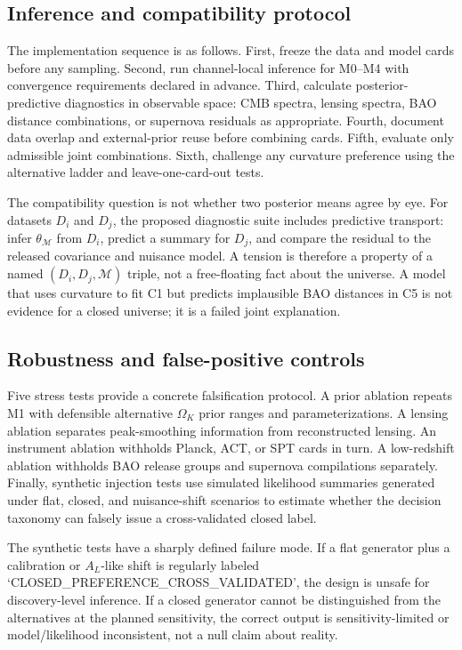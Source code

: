 \documentclass[conference]{IEEEtran}
\newcommand{\ok}{\ensuremath{\Omega_K}}
\newcommand{\model}{\mathcal{M}}
\begin{document}
\subsection{Inference and compatibility protocol}

The implementation sequence is as follows. First, freeze the data and model cards before any sampling. Second, run channel-local inference for M0--M4 with convergence requirements declared in advance. Third, calculate posterior-predictive diagnostics in observable space: CMB spectra, lensing spectra, BAO distance combinations, or supernova residuals as appropriate. Fourth, document data overlap and external-prior reuse before combining cards. Fifth, evaluate only admissible joint combinations. Sixth, challenge any curvature preference using the alternative ladder and leave-one-card-out tests.

The compatibility question is not whether two posterior means agree by eye. For datasets $D_i$ and $D_j$, the proposed diagnostic suite includes predictive transport: infer $\theta_{\model}$ from $D_i$, predict a summary for $D_j$, and compare the residual to the released covariance and nuisance model. A tension is therefore a property of a named $(D_i,D_j,\model)$ triple, not a free-floating fact about the universe. A model that uses curvature to fit C1 but predicts implausible BAO distances in C5 is not evidence for a closed universe; it is a failed joint explanation.

\subsection{Robustness and false-positive controls}

Five stress tests provide a concrete falsification protocol. A prior ablation repeats M1 with defensible alternative $\ok$ prior ranges and parameterizations. A lensing ablation separates peak-smoothing information from reconstructed lensing. An instrument ablation withholds Planck, ACT, or SPT cards in turn. A low-redshift ablation withholds BAO release groups and supernova compilations separately. Finally, synthetic injection tests use simulated likelihood summaries generated under flat, closed, and nuisance-shift scenarios to estimate whether the decision taxonomy can falsely issue a cross-validated closed label.

The synthetic tests have a sharply defined failure mode. If a flat generator plus a calibration or $A_L$-like shift is regularly labeled `CLOSED\_PREFERENCE\_CROSS\_VALIDATED', the design is unsafe for discovery-level inference. If a closed generator cannot be distinguished from the alternatives at the planned sensitivity, the correct output is sensitivity-limited or model/likelihood inconsistent, not a null claim about reality.
\end{document}
